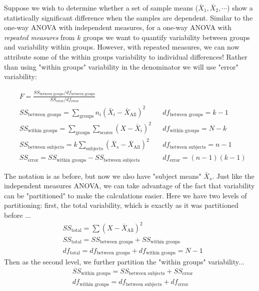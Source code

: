 \documentclass{tufte-handout}
\begin{document}
Suppose we wish to determine whether a set of sample means ($\bar{X}_1,\bar{X}_2,\cdots$) show a statistically significant difference when the samples are dependent. Similar to the one-way ANOVA with independent measures, for a one-way ANOVA with \emph{repeated measures} from $k$  groups we want to quantify variability between groups and variability within groups. However, with repeated measures, we can now attribute some of the within groups variability to individual differences! Rather than using "within groups" variability in the denominator we will use "error" variability:

\begin{align*}
&F=\frac{SS_{\text{between groups}}/df_{\text{between groups}}}{SS_{\text{error}}/df_{\text{error}}} & &\\
&SS_{\text{between groups}}=\sum_{\text{groups}} n_i(\bar{X}_i-\bar{X}_{\text{All}})^2 & &df_{\text{between groups}}=k-1\\
&SS_{\text{within groups}} =\sum_{\text{groups}} \sum_{\text{scores}} (X-\bar{X}_i)^2  & &df_{\text{within groups}}=N-k\\
&SS_{\text{between subjects}} = k \sum_{\text{subjects}} (\bar{X}_{s}-\bar{X}_{\text{All}})^2 & &df_{\text{between subjects}}=n-1\\
&SS_{\text{error}} = SS_{\text{within groups}} - SS_{\text{between subjects}}& &df_{\text{error}}=(n-1)(k-1)
\end{align*}

The notation is as before, but now we also have "subject means" $\bar{X}_s$. Just like the independent measures ANOVA, we can take advantage of the fact that variability can be "partitioned" to make the calculations easier. Here we have two levels of partitioning: first, the total variability, which is exactly as it was partitioned before $\dots$
\begin{align*}
&SS_{\text{total}}=\sum (X-\bar{X}_{\text{All}})^2\\
&SS_{\text{total}}=SS_{\text{between groups}} + SS_{\text{within groups}}\\
&df_{\text{total}}=df_{\text{between groups}} + df_{\text{within groups}}=N-1
\end{align*}
Then as the second level, we further partition the "within groups" variability...
\begin{align*}
&SS_{\text{within groups}}=SS_{\text{between subjects}} + SS_{\text{error}}\\
&df_{\text{within groups}}=df_{\text{between subjects}} + df_{\text{error}}
\end{align*}
\end{document}
